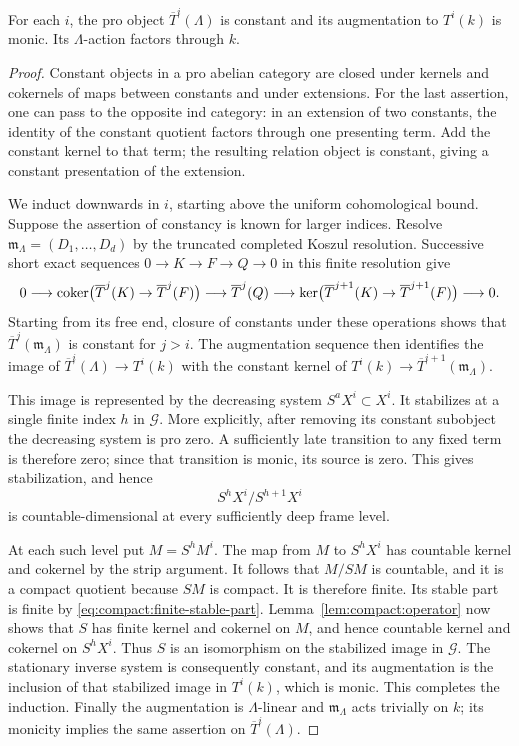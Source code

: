 \begin{lemma}\label{lem:compact:pro-constant}
For each $i$, the pro object $\overline T^i(\Lambda)$ is constant and
its augmentation to $T^i(k)$ is monic.  Its $\Lambda$-action factors
through $k$.
\end{lemma}

\begin{proof}
Constant objects in a pro abelian category are closed under kernels
and cokernels of maps between constants and under extensions.  For the
last assertion, one can pass to the opposite ind category: in an
extension of two constants, the identity of the constant quotient
factors through one presenting term.  Add the constant kernel to that
term; the resulting relation object is constant, giving a constant
presentation of the extension.

We induct downwards in $i$, starting above the uniform cohomological
bound.  Suppose the assertion of constancy is known for larger indices.
Resolve $\mathfrak m_\Lambda=(D_1,\ldots,D_d)$ by the truncated
completed Koszul resolution.  Successive short exact sequences
$0\to K\to F\to Q\to0$ in this finite resolution give
\[
0\longrightarrow
 \operatorname{coker}\bigl(\overline T^j(K)\to\overline T^j(F)\bigr)
 \longrightarrow\overline T^j(Q)
 \longrightarrow
 \ker\bigl(\overline T^{j+1}(K)\to\overline T^{j+1}(F)\bigr)
 \longrightarrow0.
\]
Starting from its free end, closure of constants under these operations
shows that $\overline T^j(\mathfrak m_\Lambda)$ is constant for
$j>i$.  The augmentation sequence then identifies the image of
$\overline T^i(\Lambda)\to T^i(k)$ with the constant kernel of
$T^i(k)\to\overline T^{i+1}(\mathfrak m_\Lambda)$.

This image is represented by the decreasing system $S^aX^i\subset X^i$.
It stabilizes at a single finite index $h$ in $\mathscr G$.  More
explicitly, after removing its constant subobject the decreasing
system is pro zero.  A sufficiently late transition to any fixed term
is therefore zero; since that transition is monic, its source is zero.
This gives stabilization, and hence
\[
              S^hX^i/S^{h+1}X^i
\]
is countable-dimensional at every sufficiently deep frame level.

At each such level put $M=S^hM^i$.  The map from $M$ to $S^hX^i$ has
countable kernel and cokernel by the strip argument.  It follows that
$M/SM$ is countable, and it is a compact quotient because $SM$ is
compact.  It is therefore finite.  Its stable part is finite by
\eqref{eq:compact:finite-stable-part}.  Lemma~\ref{lem:compact:operator}
now shows that $S$ has finite kernel and cokernel on $M$, and hence
countable kernel and cokernel on $S^hX^i$.  Thus $S$ is an isomorphism
on the stabilized image in $\mathscr G$.  The stationary inverse
system is consequently constant, and its augmentation is the inclusion
of that stabilized image in $T^i(k)$, which is monic.  This completes
the induction.  Finally the augmentation is $\Lambda$-linear and
$\mathfrak m_\Lambda$ acts trivially on $k$; its monicity implies the
same assertion on $\overline T^i(\Lambda)$.
\end{proof}

